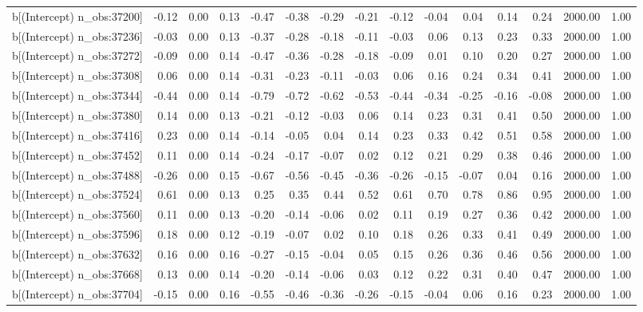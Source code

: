 \begin{table}[ht]
\begin{tabular}{rrrrrrrrrrrrrrr}
  b[(Intercept) n\_obs:37200] & -0.12 & 0.00 & 0.13 & -0.47 & -0.38 & -0.29 & -0.21 & -0.12 & -0.04 & 0.04 & 0.14 & 0.24 & 2000.00 & 1.00 \\ 
  b[(Intercept) n\_obs:37236] & -0.03 & 0.00 & 0.13 & -0.37 & -0.28 & -0.18 & -0.11 & -0.03 & 0.06 & 0.13 & 0.23 & 0.33 & 2000.00 & 1.00 \\ 
  b[(Intercept) n\_obs:37272] & -0.09 & 0.00 & 0.14 & -0.47 & -0.36 & -0.28 & -0.18 & -0.09 & 0.01 & 0.10 & 0.20 & 0.27 & 2000.00 & 1.00 \\ 
  b[(Intercept) n\_obs:37308] & 0.06 & 0.00 & 0.14 & -0.31 & -0.23 & -0.11 & -0.03 & 0.06 & 0.16 & 0.24 & 0.34 & 0.41 & 2000.00 & 1.00 \\ 
  b[(Intercept) n\_obs:37344] & -0.44 & 0.00 & 0.14 & -0.79 & -0.72 & -0.62 & -0.53 & -0.44 & -0.34 & -0.25 & -0.16 & -0.08 & 2000.00 & 1.00 \\ 
  b[(Intercept) n\_obs:37380] & 0.14 & 0.00 & 0.13 & -0.21 & -0.12 & -0.03 & 0.06 & 0.14 & 0.23 & 0.31 & 0.41 & 0.50 & 2000.00 & 1.00 \\ 
  b[(Intercept) n\_obs:37416] & 0.23 & 0.00 & 0.14 & -0.14 & -0.05 & 0.04 & 0.14 & 0.23 & 0.33 & 0.42 & 0.51 & 0.58 & 2000.00 & 1.00 \\ 
  b[(Intercept) n\_obs:37452] & 0.11 & 0.00 & 0.14 & -0.24 & -0.17 & -0.07 & 0.02 & 0.12 & 0.21 & 0.29 & 0.38 & 0.46 & 2000.00 & 1.00 \\ 
  b[(Intercept) n\_obs:37488] & -0.26 & 0.00 & 0.15 & -0.67 & -0.56 & -0.45 & -0.36 & -0.26 & -0.15 & -0.07 & 0.04 & 0.16 & 2000.00 & 1.00 \\ 
  b[(Intercept) n\_obs:37524] & 0.61 & 0.00 & 0.13 & 0.25 & 0.35 & 0.44 & 0.52 & 0.61 & 0.70 & 0.78 & 0.86 & 0.95 & 2000.00 & 1.00 \\ 
  b[(Intercept) n\_obs:37560] & 0.11 & 0.00 & 0.13 & -0.20 & -0.14 & -0.06 & 0.02 & 0.11 & 0.19 & 0.27 & 0.36 & 0.42 & 2000.00 & 1.00 \\ 
  b[(Intercept) n\_obs:37596] & 0.18 & 0.00 & 0.12 & -0.19 & -0.07 & 0.02 & 0.10 & 0.18 & 0.26 & 0.33 & 0.41 & 0.49 & 2000.00 & 1.00 \\ 
  b[(Intercept) n\_obs:37632] & 0.16 & 0.00 & 0.16 & -0.27 & -0.15 & -0.04 & 0.05 & 0.15 & 0.26 & 0.36 & 0.46 & 0.56 & 2000.00 & 1.00 \\ 
  b[(Intercept) n\_obs:37668] & 0.13 & 0.00 & 0.14 & -0.20 & -0.14 & -0.06 & 0.03 & 0.12 & 0.22 & 0.31 & 0.40 & 0.47 & 2000.00 & 1.00 \\ 
  b[(Intercept) n\_obs:37704] & -0.15 & 0.00 & 0.16 & -0.55 & -0.46 & -0.36 & -0.26 & -0.15 & -0.04 & 0.06 & 0.16 & 0.23 & 2000.00 & 1.00 \\ 

\end{tabular}
\end{table}
